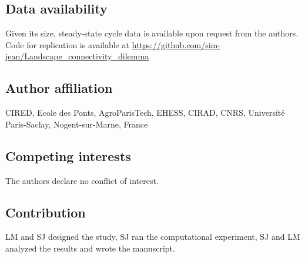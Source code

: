 \subsection*{Data availability}
Given its size, steady-state cycle data is available upon request from the authors. Code for replication is available at \url{https://github.com/sim-jean/Landscape_connectivity_dilemma}

\subsection*{Author affiliation}
CIRED, Ecole des Ponts, AgroParisTech, EHESS, CIRAD, CNRS, Université Paris-Saclay, Nogent-sur-Marne, France
\subsection*{Competing interests}
The authors declare no conflict of interest.

\subsection*{Contribution}
LM and SJ designed the study, SJ ran the computational experiment, SJ and LM analyzed the results and wrote the manuscript.

\newpage

\renewcommand{\thesection}{\Alph{section}}
\setcounter{section}{0}
\renewcommand{\thesubsection}{\Alph{subsection}}


